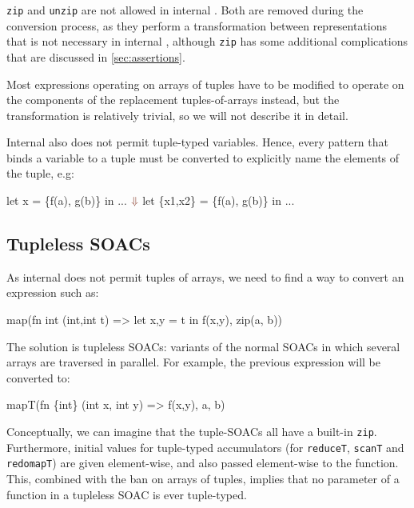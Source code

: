 \texttt{zip} and \texttt{unzip} are not allowed in internal \LO{}.
Both are removed during the conversion process, as they perform a
transformation between representations that is not necessary in
internal \LO{}, although \texttt{zip} has some additional
complications that are discussed in \cref{sec:assertions}.

Most expressions operating on arrays of tuples have to be modified to
operate on the components of the replacement tuples-of-arrays instead,
but the transformation is relatively trivial, so we will not describe
it in detail.

Internal \LO{} also does not permit tuple-typed variables.  Hence,
every pattern that binds a variable to a tuple must be converted to
explicitly name the elements of the tuple, e.g:

\begin{colorcode}
let x = \{f(a), g(b)\} in
...
  \(\emp{\Downarrow}\)
let \{x1,x2\} = \{f(a), g(b)\} in
...
\end{colorcode}

\subsection{Tupleless SOACs}

As internal \LO{} does not permit tuples of arrays, we need to find a
way to convert an expression such as:
\begin{colorcode}
map(fn int ({int,int} t) =>
      let {x,y} = t in
      f(x,y),
    zip(a, b))
\end{colorcode}
The solution is tupleless SOACs: variants of the normal SOACs in which
several arrays are traversed in parallel.  For example, the previous
expression will be converted to:
\begin{colorcode}
mapT(fn \{int\} (int x, int y) =>
       f(x,y),
     a, b)
\end{colorcode}
Conceptually, we can imagine that the tuple-SOACs all have a built-in
\texttt{zip}.  Furthermore, initial values for tuple-typed
accumulators (for \texttt{reduceT}, \texttt{scanT} and
\texttt{redomapT}) are given element-wise, and also passed
element-wise to the function.  This, combined with the ban on arrays
of tuples, implies that no parameter of a function in a tupleless SOAC
is ever tuple-typed.

